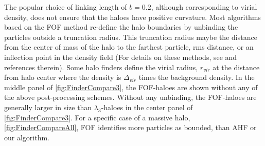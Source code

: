 The popular choice of linking length of $b=0.2$, although corresponding to virial density, does not ensure that the haloes have positive curvature. Most algorithms based on the FOF method re-define the halo boundaries by unbinding the particles outside a truncation radius. This truncation radius maybe the distance from the center of mass of the halo to the farthest particle, rms distance, or an inflection point in the density field (For details on these methods, see \citealt{Knebe2011a} and references therein). Some halo finders define the virial radius, $r_{vir}$ at the distance from halo center where the density is $\Delta_{vir}$ times the background density. In the middle panel of \autoref{fig:FinderCompare3}, the FOF-haloes are shown without any of the above post-processing schemes. Without any unbinding, the FOF-haloes are generally larger in size than $\lambda_3$-haloes in the center panel of \autoref{fig:FinderCompare3}. For a specific case of a massive halo, \autoref{fig:FinderCompareAll}, FOF identifies more particles as bounded, than AHF or our algorithm.  

